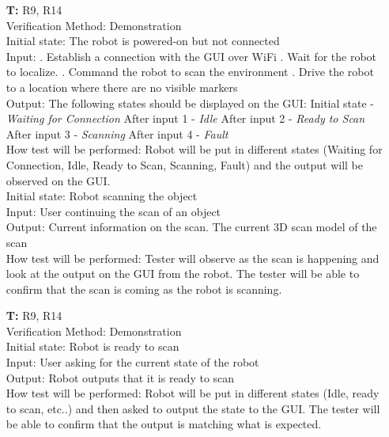 \documentclass[12pt, titlepage]{article}
\newcounter{tnum} %
\begin{document}
\begin{itemize}
\item[\textbf{T\refstepcounter{tnum}\thetnum:}]{R9, R14\\}
Verification Method: Demonstration\\
Initial state: The robot is powered-on but not connected\\
Input: 
. Establish a connection with the GUI over WiFi . Wait for the robot to localize.
. Command the robot to scan the environment
. Drive the robot to a location where there are no visible markers\\
Output: The following states should be displayed on the GUI:
\newline Initial state - \textit{Waiting for Connection} \newline After input 1 - \textit{Idle} 
\newline After input 2 - \textit{Ready to Scan} 
\newline After input 3 - \textit{Scanning}
\newline After input 4 - \textit{Fault}  \\
How test will be performed: Robot will be put in different states (Waiting for Connection, Idle, Ready to Scan, Scanning, Fault) and the output will be observed on the GUI. \\
Initial state: Robot scanning the object\\
Input: User continuing the scan of an object \\
Output: Current information on the scan. The current 3D scan model of the scan\\
How test will be performed: Tester will observe as the scan is happening and look at the output on the GUI from the robot. The tester will be able to confirm that the scan is coming as the robot is scanning.\\

\item[\textbf{T\refstepcounter{tnum}\thetnum:}]{R9, R14\\}
Verification Method: Demonstration\\
Initial state: Robot is ready to scan\\
Input: User asking for the current state of the robot\\
Output: Robot outputs that it is ready to scan\\
How test will be performed: Robot will be put in different states (Idle, ready to scan, etc..) and then asked to output the state to the GUI. The tester will be able to confirm that the output is matching what is expected. \\

\end{itemize}
\end{document}
